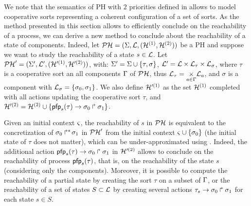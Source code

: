 \newcommand{\total}{\tau}
\newcommand{\reach}{\sigma}

We note that the semantics of PH with $2$ priorities defined in  allows to model cooperative sorts representing a coherent configuration of a set of sorts.
As the method presented in this section allows to efficiently conclude on the reachability of a process,
we can derive a new method to conclude about the reachability of a state of components.
Indeed, let $\mathcal{PH} = (\Sigma, \mathcal{L}, (\mathcal{H}^{(1)}, \mathcal{H}^{(2)}))$ be a PH and suppose we want to study the reachability of a state $s \in \mathcal{L}$.
Let $\mathcal{PH}' = (\Sigma', \mathcal{L}', (\mathcal{H}'^{(1)}, \mathcal{H}'^{(2)}))$,
with: $\PHs' = \PHs \cup \{ \total, \reach \}$, $\PHl' = \PHl \times \PHl_\total \times \PHl_\reach$,
where $\total$ is a cooperative sort an all components $\Gamma$ of $\mathcal{PH}$, thus $\PHl_\total = \underset{a \in \components}{\times} \PHl_a$,
and $\reach$ is a component with $\PHl_\reach = \{ \reach_0, \reach_1 \}$.
We also define $\mathcal{H}'^{(1)}$ as the set $\mathcal{H}^{(1)}$ completed with all actions updating the cooperative sort $\total$,
and $\PHh'^{(2)} = \PHh^{(2)} \cup \{ \PHhit{\pfp_s(\total)}{\reach_0}{\reach_1} \}$.

Given an initial context $\varsigma$, the reachability of $s$ in $\mathcal{PH}$ is equivalent to the concretization of $\PHobjp{\reach}{0}{1}$ in $\mathcal{PH}'$ from the initial context $\ctx \cup \{ \reach_0 \}$ (the initial state of $\total$ does not matter), which can be under-approximated using .
Indeed, the additional action $\PHhit{\pfp_s(\total)}{\reach_0}{\reach_1}$ in $\mathcal{H}'^{(2)}$ allows to conclude on the reachability of process $\pfp_s(\total)$, that is, on the reachability of the state $s$ (considering only the components).
Moreover, it is possible to compute the reachability of a partial state by creating the sort $\total$ on a subset of $\Gamma$,
or the reachability of a set of states $S \subset \mathcal{L}$ by creating several actions $\PHhit{\total_s}{\reach_0}{\reach_1}$ for each state $s \in S$.
